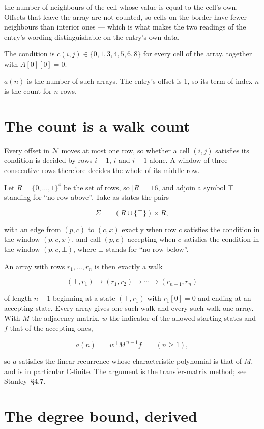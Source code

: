 \documentclass[11pt]{article}
\theoremstyle{definition}
\begin{document}
the number of neighbours of the cell whose value is equal to the cell's own. Offsets that leave the array are not counted, so cells on the border have fewer neighbours than interior ones --- which is what makes the two readings of the entry's wording distinguishable on the entry's own data.

The condition is $c(i,j) \in \{0, 1, 3, 4, 5, 6, 8\}$ for every cell of the array, together with $A[0][0]=0$.

$a(n)$ is the number of such arrays. The entry's offset is 1, so its term of index $n$ is the count for $n$ rows.

\section{The count is a walk count}

Every offset in $\mathcal{N}$ moves at most one row, so whether a cell $(i,j)$ satisfies its condition is decided by rows $i-1$, $i$ and $i+1$ alone. A window of three consecutive rows therefore decides the whole of its middle row.

Let $R = \{0,\dots,1\}^{4}$ be the set of rows, so $|R| = 16$, and adjoin a symbol $\top$ standing for ``no row above''. Take as states the pairs

\[\Sigma \;=\; (R \cup \{\top\}) \times R,\]

with an edge from $(p,c)$ to $(c,x)$ exactly when row $c$ satisfies the condition in the window $(p,c,x)$, and call $(p,c)$ accepting when $c$ satisfies the condition in the window $(p,c,\bot)$, where $\bot$ stands for ``no row below''.

An array with rows $r_1,\dots,r_n$ is then exactly a walk

\[(\top,r_1) \to (r_1,r_2) \to \cdots \to (r_{n-1},r_n)\]

of length $n-1$ beginning at a state $(\top,r_1)$ with $r_1[0]=0$ and ending at an accepting state. Every array gives one such walk and every such walk one array. With $M$ the adjacency matrix, $w$ the indicator of the allowed starting states and $f$ that of the accepting ones,

\[a(n) \;=\; w^{\mathsf T} M^{\,n-1} f \qquad (n \ge 1),\]

so $a$ satisfies the linear recurrence whose characteristic polynomial is that of $M$, and is in particular C-finite. The argument is the transfer-matrix method; see Stanley~\S4.7.

\section{The degree bound, derived}
\end{document}
